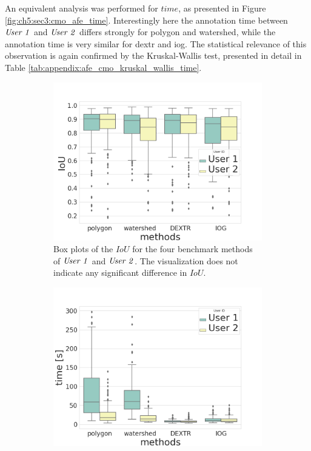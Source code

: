 An equivalent analysis was performed for $ time $, as presented in Figure \ref{fig:ch5:sec3:cmo_afe_time}.
Interestingly here the annotation time between $ \textnormal{\textit{User 1}} $ and $ \textnormal{\textit{User 2}} $ differs strongly for polygon and watershed, while the annotation time is very similar for \gls{dextr} and \gls{iog}.
The statistical relevance of this observation is again confirmed by the Kruskal-Wallis test, presented in detail in Table \ref{tab:appendix:afe_cmo_kruskal_wallis_time}.

\begin{figure} [h!]
 	\centering
 	\begin{subfigure}[t]{0.45\textwidth}
 		\centering
 		\includegraphics[width=\textwidth]{figures/chap53_afe_cmo_iou.png}
 		\caption{
 			Box plots of the $ IoU $ for the four benchmark methods of $ \textnormal{\textit{User 1}} $ and $ \textnormal{\textit{User 2}} $.
 			The visualization does not indicate any significant difference in $ IoU $.
 		} \label{fig:ch5:sec3:cmo_afe_iou}
 	\end{subfigure}
 	\hfill
 	\begin{subfigure}[t]{0.45\textwidth}
 		\centering
 		\includegraphics[width=\textwidth]{figures/chap53_afe_cmo_time.png}

\end{subfigure}
\end{figure}
